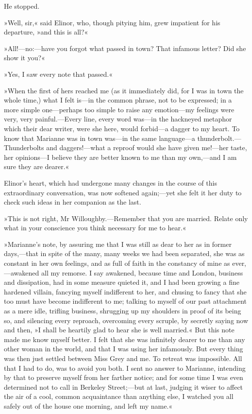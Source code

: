 He stopped.

»Well, sir,« said Elinor, who, though pitying him, grew impatient for his departure, »and this is all?«

»All!—no:—have you forgot what passed in town? That infamous letter? Did she show it you?«

»Yes, I saw every note that passed.«

»When the first of hers reached me (as it immediately did, for I was in town the whole time,) what I felt is—in the common phrase, not to be expressed; in a more simple one—perhaps too simple to raise any emotion—my feelings were very, very painful.—Every line, every word was—in the hackneyed metaphor which their dear writer, were she here, would forbid—a dagger to my heart. To know that Marianne was in town was—in the same language—a thunderbolt.—Thunderbolts and daggers!—what a reproof would she have given me!—her taste, her opinions—I believe they are better known to me than my own,—and I am sure they are dearer.«

Elinor’s heart, which had undergone many changes in the course of this extraordinary conversation, was now softened again;—yet she felt it her duty to check such ideas in her companion as the last.

»This is not right, Mr Willoughby.—Remember that you are married. Relate only what in your conscience you think necessary for me to hear.«

»Marianne’s note, by assuring me that I was still as dear to her as in former days,—that in spite of the many, many weeks we had been separated, she was as constant in her own feelings, and as full of faith in the constancy of mine as ever,—awakened all my remorse. I say awakened, because time and London, business and dissipation, had in some measure quieted it, and I had been growing a fine hardened villain, fancying myself indifferent to her, and chusing to fancy that she too must have become indifferent to me; talking to myself of our past attachment as a mere idle, trifling business, shrugging up my shoulders in proof of its being so, and silencing every reproach, overcoming every scruple, by secretly saying now and then, »I shall be heartily glad to hear she is well married.« But this note made me know myself better. I felt that she was infinitely dearer to me than any other woman in the world, and that I was using her infamously. But every thing was then just settled between Miss Grey and me. To retreat was impossible. All that I had to do, was to avoid you both. I sent no answer to Marianne, intending by that to preserve myself from her farther notice; and for some time I was even determined not to call in Berkeley Street;—but at last, judging it wiser to affect the air of a cool, common acquaintance than anything else, I watched you all safely out of the house one morning, and left my name.«


